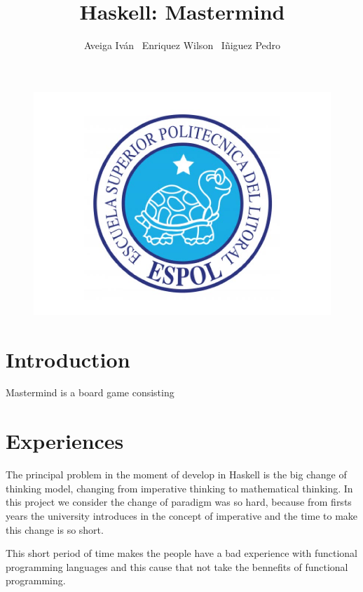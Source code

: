 \documentclass[a4paper,11pt]{book}
\begin{document}
\author{
	Aveiga Iván \ Enriquez Wilson \ Iñiguez Pedro
}
\title{Haskell: Mastermind}
\maketitle
\begin{figure}[h]
\centering
\includegraphics[width=0.7\linewidth]{./logo}
\end{figure}

\newpage

\section{Introduction}
Mastermind is a board game consisting



\section{Experiences}
The principal problem in the moment of develop in Haskell is the big change of thinking model, changing from imperative thinking to mathematical thinking. In this project we consider the change of paradigm was so hard, because from firsts years the university introduces in the concept of imperative and the time to make this change is so short. 

This short period of time makes the people have a bad experience with functional programming languages and this cause that not take the bennefits of functional programming.
\end{document}
